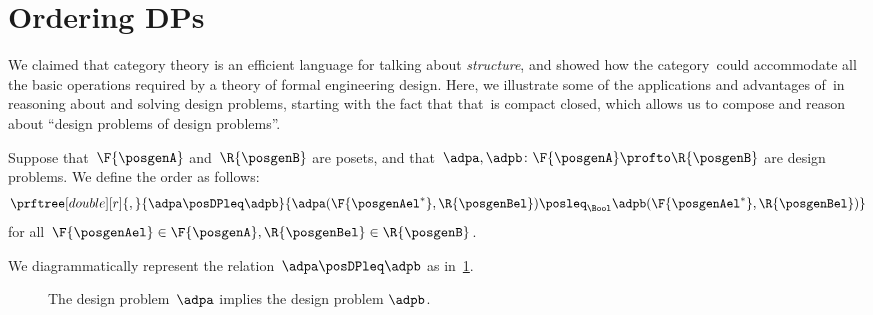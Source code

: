 
\section{Ordering DPs}
\label{sec:ordering-order}

We claimed that category theory is an efficient language for talking about \emph{structure}, and showed how the category~\DP could accommodate all the basic operations required by a theory of formal engineering design.
Here, we illustrate some of the applications and advantages of~\DP in reasoning about and solving design problems, starting with the fact that that~\DP is compact closed, which allows us to compose and reason about ``design problems of design problems''.

\begin{definition}[Order on~\DP]
	\label{def:DP_loc_pos}
	Suppose that~$\F{\posgenA}$ and~$\R{\posgenB}$ are posets, and that~$\adpa,\adpb \colon \F{\posgenA} \profto \R{\posgenB}$ are design problems.
	We define the order as follows:
	\begin{equation*}
		\prftree[double][r]{,}{
			\adpa \posDPleq \adpb
		}{
			\adpa(\F{\posgenAel^*},\R{\posgenBel}) \posleq_\Bool \adpb(\F{\posgenAel^*},\R{\posgenBel})
		}
	\end{equation*}
	for all~$\F{\posgenAel} \in \F{\posgenA},\R{\posgenBel} \in \R{\posgenB}$.
\end{definition}

We diagrammatically represent the relation~$\adpa \posDPleq \adpb$ as in~\cref{fig:dpimplies}.

\begin{figure}[h!]
	\centering
	\caption{The design problem~$\adpa$ implies the design problem $\adpb$.}
	\label{fig:dpimplies}
\end{figure}

